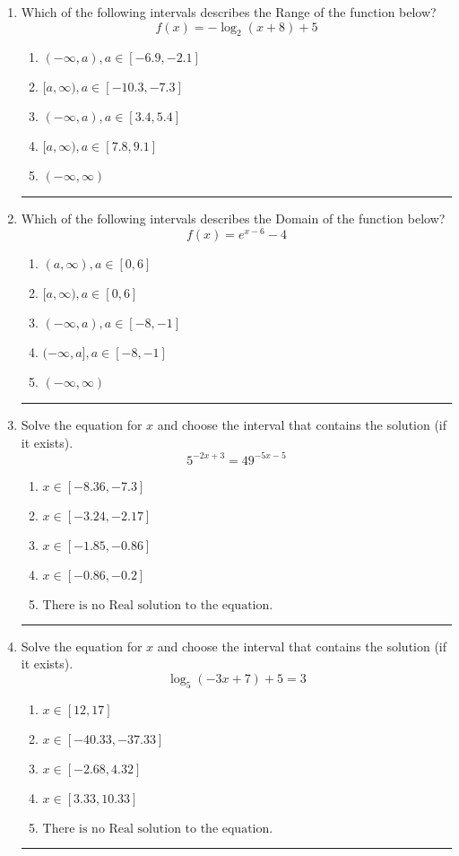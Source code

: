 \documentclass[14pt]{extbook}
\newcommand{\litem}[1]{\item#1\hspace*{-1cm}\rule{\textwidth}{0.4pt}}
\begin{document}
\begin{enumerate}
{\begin{enumerate}[label=\Alph*.]
\end{enumerate} }
\litem{
Which of the following intervals describes the Range of the function below?\[ f(x) = -\log_2{(x+8)}+5 \]\begin{enumerate}[label=\Alph*.]
\item \( (-\infty, a), a \in [-6.9, -2.1] \)
\item \( [a, \infty), a \in [-10.3, -7.3] \)
\item \( (-\infty, a), a \in [3.4, 5.4] \)
\item \( [a, \infty), a \in [7.8, 9.1] \)
\item \( (-\infty, \infty) \)

\end{enumerate} }
\litem{
Which of the following intervals describes the Domain of the function below?\[ f(x) = e^{x-6}-4 \]\begin{enumerate}[label=\Alph*.]
\item \( (a, \infty), a \in [0, 6] \)
\item \( [a, \infty), a \in [0, 6] \)
\item \( (-\infty, a), a \in [-8, -1] \)
\item \( (-\infty, a], a \in [-8, -1] \)
\item \( (-\infty, \infty) \)

\end{enumerate} }
\litem{
Solve the equation for $x$ and choose the interval that contains the solution (if it exists).\[ 5^{-2x+3} = 49^{-5x-5} \]\begin{enumerate}[label=\Alph*.]
\item \( x \in [-8.36, -7.3] \)
\item \( x \in [-3.24, -2.17] \)
\item \( x \in [-1.85, -0.86] \)
\item \( x \in [-0.86, -0.2] \)
\item \( \text{There is no Real solution to the equation.} \)

\end{enumerate} }
\litem{
Solve the equation for $x$ and choose the interval that contains the solution (if it exists).\[ \log_{5}{(-3x+7)}+5 = 3 \]\begin{enumerate}[label=\Alph*.]
\item \( x \in [12, 17] \)
\item \( x \in [-40.33, -37.33] \)
\item \( x \in [-2.68, 4.32] \)
\item \( x \in [3.33, 10.33] \)
\item \( \text{There is no Real solution to the equation.} \)


\end{enumerate}}
\end{enumerate}
\end{document}
